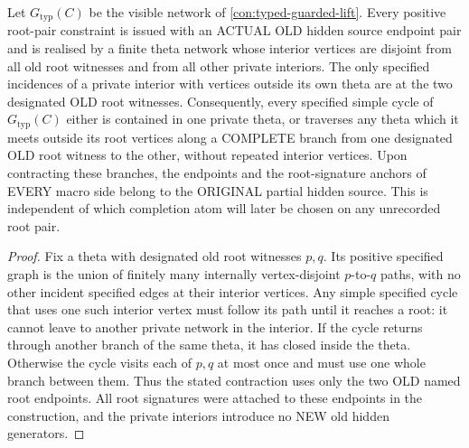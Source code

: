 \begin{lemma}
\label{lem:typed-private-theta-cycle}
Let \(G_{\mathrm{typ}}(C)\) be the visible
network of \cref{con:typed-guarded-lift}.
Every positive root-pair constraint
is issued with an ACTUAL OLD hidden
source endpoint pair and is realised
by a finite theta network whose
interior vertices are disjoint from
all old root witnesses and from
all other private interiors. The
only specified incidences of a
private interior with vertices
outside its own theta are at the
two designated OLD root witnesses.
Consequently, every specified simple
cycle of \(G_{\mathrm{typ}}(C)\) either
is contained in one private theta,
or traverses any theta which it
meets outside its root vertices
along a COMPLETE branch from
one designated OLD root witness
to the other, without repeated
interior vertices. Upon contracting
these branches, the endpoints
and the root-signature anchors of
EVERY macro side belong to the
ORIGINAL partial hidden source.
This is independent of which
completion atom will later be
chosen on any unrecorded root pair.
\end{lemma}
\begin{proof}
Fix a theta with designated old
root witnesses \(p,q\).
Its positive specified graph
is the union of finitely many
internally vertex-disjoint
\(p\)-to-\(q\) paths, with no
other incident specified edges
at their interior vertices.
Any simple specified cycle that
uses one such interior vertex
must follow its path until it
reaches a root: it cannot leave
to another private network in
the interior. If the cycle
returns through another branch
of the same theta, it has
closed inside the theta. Otherwise
the cycle visits each of \(p,q\)
at most once and must use one
whole branch between them.
Thus the stated contraction
uses only the two OLD named
root endpoints. All root
signatures were attached to
these endpoints in the
construction, and the
private interiors introduce
no NEW old hidden generators.
\end{proof}

